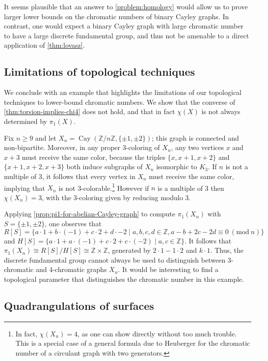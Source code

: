 \documentclass[12pt,letterpaper]{amsart}
\theoremstyle{definition}
\theoremstyle{remark}
\newcommand{\Z}{{\mathbb Z}}
\DeclareMathOperator{\Cay}{Cay}
\begin{document}
It seems plausible that an answer to \cref{problem:homology} would allow us to prove larger lower bounds on the chromatic numbers of binary Cayley graphs. In contrast, one would expect a binary Cayley graph with large chromatic number to have a large discrete fundamental group, and thus not be amenable to a direct application of \cref{thm:lovasz}.



\subsection{Limitations of topological techniques}\label{sub:failure}
We conclude with an example that highlights the limitations of our topological techniques to lower-bound chromatic numbers. We show that the converse of \cref{thm:torsion-implies-chi4} does not hold, and that in fact $\chi(X)$ is not always determined by $\pi_1(X)$. 

Fix $n\geq 9$ and let $X_n=\Cay(\Z/n\Z,\{\pm 1,\pm 2\})$; this graph is connected and non-bipartite. Moreover, in any proper 3-coloring of $X_n$, any two vertices $x$ and $x+3$ must receive the same color, because the triples $\{x,x+1,x+2\}$ and $\{x+1,x+2,x+3\}$ both induce subgraphs of $X_n$ isomorphic to $K_3$. If $n$ is not a multiple of 3, it follows that every vertex in $X_n$ must receive the same color, implying that $X_n$ is not 3-colorable.\footnote{In fact, $\chi(X_n)=4$, as one can show directly without too much trouble.  This is a special case of a general formula due to Heuberger \cite{Heu} for the chromatic number of a circulant graph with two generators.} However if $n$ is a multiple of 3 then $\chi(X_n)=3$, with the 3-coloring given by reducing modulo 3.

Applying \cref{prop:pi1-for-abelian-Cayley-graph} to compute $\pi_1(X_n)$ with $S=\{\pm 1,\pm 2\}$, one observes that
\[R[S]=\{a\cdot 1+b\cdot(-1)+c\cdot2+d\cdot-2\mid a,b,c,d\in\Z, a-b+2c-2d\equiv 0\ (\mathrm{mod}\ n)\}\]
and $H[S]=\{a\cdot 1+a\cdot(-1)+c\cdot 2+c\cdot(-2)\mid a,c\in\Z\}$. It follows that $\pi_1(X_n)\cong R[S]/H[S]\cong\Z\times\Z$, generated by $2\cdot 1-1\cdot 2$ and $k\cdot 1$. Thus, the discrete fundamental group cannot always be used to distinguish between 3-chromatic and 4-chromatic graphs $X_n$. It would be interesting to find a topological parameter that distinguishes the chromatic number in this example.


\subsection{Quadrangulations of surfaces}\label{sub:failure}
\end{document}
